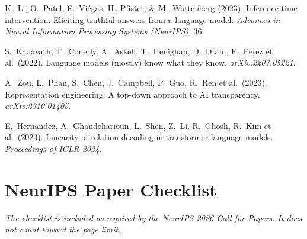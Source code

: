 \documentclass{article}
\begin{document}
{\begin{enumerate}[leftmargin=2em,itemsep=2pt,label={[\arabic*]}]
\item K.\ Li, O.\ Patel, F.\ Vi\'{e}gas, H.\ Pfister, \& M.\ Wattenberg
  (2023).
  Inference-time intervention: Eliciting truthful answers from a language
  model.
  \textit{Advances in Neural Information Processing Systems (NeurIPS)}, 36.

\item S.\ Kadavath, T.\ Conerly, A.\ Askell, T.\ Henighan, D.\ Drain,
  E.\ Perez et al.\ (2022).
  Language models (mostly) know what they know.
  \textit{arXiv:2207.05221}.

\item A.\ Zou, L.\ Phan, S.\ Chen, J.\ Campbell, P.\ Guo, R.\ Ren et al.\
  (2023).
  Representation engineering: A top-down approach to AI transparency.
  \textit{arXiv:2310.01405}.

\item E.\ Hernandez, A.\ Ghandeharioun, L.\ Shen, Z.\ Li, R.\ Ghosh,
  R.\ Kim et al.\ (2023).
  Linearity of relation decoding in transformer language models.
  \textit{Proceedings of ICLR 2024}.

\end{enumerate}
}

\newpage
\section*{NeurIPS Paper Checklist}

\noindent\textit{The checklist is included as required by the NeurIPS 2026
Call for Papers. It does not count toward the page limit.}

\vspace{6pt}
\end{document}
